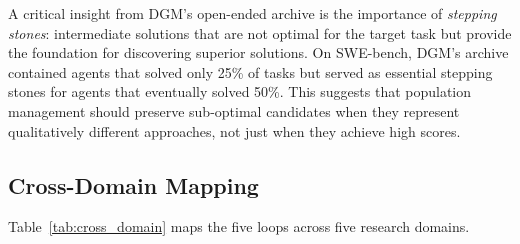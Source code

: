 A critical insight from DGM's open-ended archive is the importance of \emph{stepping stones}: intermediate solutions that are not optimal for the target task but provide the foundation for discovering superior solutions. On SWE-bench, DGM's archive contained agents that solved only 25\% of tasks but served as essential stepping stones for agents that eventually solved 50\%. This suggests that population management should preserve sub-optimal candidates when they represent qualitatively different approaches, not just when they achieve high scores.


\subsection{Cross-Domain Mapping}
\label{sec:cross-domain}

Table~\ref{tab:cross_domain} maps the five loops across five research domains.

\begin{table}[t]
\centering
\small
\caption{Cross-domain mapping of the Five Evolution Loops. Each cell lists representative systems and the loop's role.}
\label{tab:cross_domain}
\end{table}

